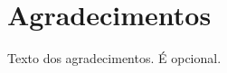 \cleardoublepage\newpage
\chapter*{Agradecimentos} \label{agradecimentos}
Texto dos agradecimentos. É opcional.\\